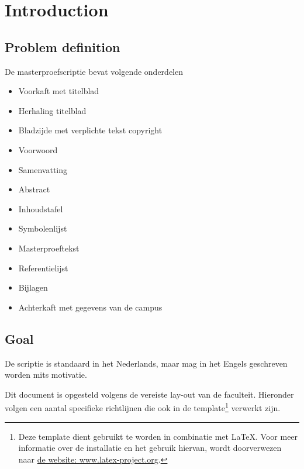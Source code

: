 
\chapter{Introduction}

\section{Problem definition}

De masterproefscriptie bevat volgende onderdelen

\begin{itemize}
\item	Voorkaft met titelblad
\item   Herhaling titelblad
\item	Bladzijde met verplichte tekst copyright
\item	Voorwoord
\item	Samenvatting
\item	Abstract
\item	Inhoudstafel
\item	Symbolenlijst
\item	Masterproeftekst
\item	Referentielijst
\item	Bijlagen
\item	Achterkaft met gegevens van de campus
\end{itemize}

\section{Goal}
De scriptie is standaard in het Nederlands, maar mag in het Engels geschreven worden mits motivatie. 

Dit document is opgesteld volgens de vereiste lay-out van de faculteit. Hieronder volgen een aantal specifieke richtlijnen die ook in de template\footnote{Deze template dient gebruikt te worden in combinatie met LaTeX. Voor meer informatie over de installatie en het gebruik hiervan, wordt doorverwezen naar \href{https://www.latex-project.org}{de website: www.latex-project.org}.} verwerkt zijn.

